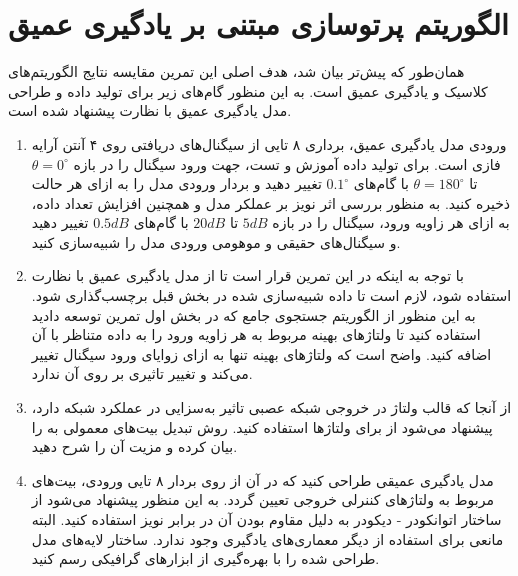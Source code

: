 \documentclass{utsignal}
\begin{document}
    \section{الگوریتم پرتوسازی مبتنی بر یادگیری عمیق}
    همان‌طور که پیش‌تر بیان شد، هدف اصلی این تمرین مقایسه نتایج الگوریتم‌های کلاسیک و یادگیری عمیق است. به این منظور گام‌های زیر برای تولید داده و طراحی مدل یادگیری عمیق با نظارت پیشنهاد شده است.
    \begin{enumerate}
    	\item ورودی مدل یادگیری عمیق، برداری ۸ تایی از سیگنال‌های دریافتی روی ۴ آنتن آرایه فازی است. برای تولید داده آموزش و تست، جهت ورود سیگنال را در بازه
    	$\theta = 0^{\circ}$
    	تا
    	$\theta = 180^{\circ}$
    	با گام‌های
    	$0.1^{\circ}$
    	تغییر دهید و بردار ورودی مدل را به ازای هر حالت ذخیره کنید. به منظور بررسی اثر نویز بر عملکر مدل و همچنین افزایش تعداد داده، به ازای هر زاویه ورود،
    	سیگنال را در بازه
    	$5dB$
    	تا
    	$20dB$
    	با گام‌های
    	$0.5dB$
    	تغییر دهید و سیگنال‌های حقیقی و موهومی ورودی مدل را شبیه‌سازی کنید.
    	\item با توجه به اینکه در این تمرین قرار است تا از مدل یادگیری عمیق با نظارت استفاده شود، لازم است تا داده شبیه‌سازی شده در بخش قبل برچسب‌گذاری شود. به این منظور از الگوریتم جستجوی جامع که در بخش اول تمرین توسعه دادید استفاده کنید تا ولتاژهای بهینه مربوط به هر زاویه ورود را به داده متناظر با آن اضافه کنید. واضح است که ولتاژهای بهینه تنها به ازای زوایای ورود سیگنال تغییر می‌کند و تغییر
    	تاثیری بر روی آن ندارد.
    	\item از آنجا که قالب ولتاژ در خروجی شبکه عصبی تاثیر به‌سزایی در عملکرد شبکه دارد، پیشنهاد می‌شود از 
    	برای ولتاژها استفاده کنید. روش تبدیل بیت‌های معمولی به
    	را بیان کرده و مزیت آن را شرح دهید.
    	\item مدل یادگیری عمیقی طراحی کنید که در آن از روی بردار ۸ تایی ورودی، بیت‌های مربوط به ولتاژهای کننرلی خروجی تعیین گردد. به این منظور پیشنهاد می‌شود از ساختار اتوانکودر - دیکودر به دلیل مقاوم بودن آن در برابر نویز استفاده کنید. البته مانعی برای استفاده از دیگر معماری‌های یادگیری وجود ندارد. ساختار لایه‌های مدل طراحی شده را با بهره‌گیری از ابزارهای گرافیکی رسم کنید.
    \end{enumerate}
\end{document}
